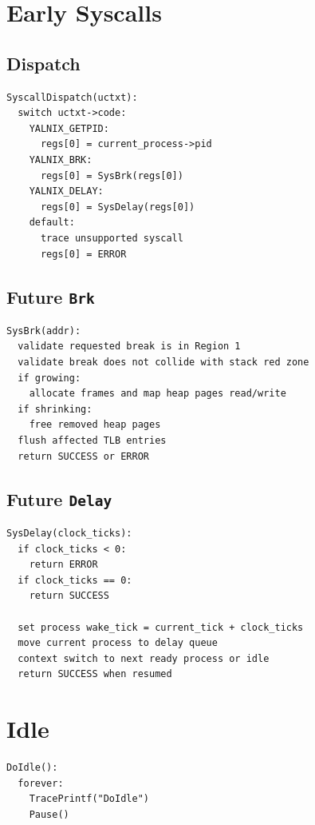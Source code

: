 \documentclass[11pt]{article}
\begin{document}
\section{Early Syscalls}

\subsection{Dispatch}

\begin{lstlisting}[style=yalnixpseudo]
SyscallDispatch(uctxt):
  switch uctxt->code:
    YALNIX_GETPID:
      regs[0] = current_process->pid
    YALNIX_BRK:
      regs[0] = SysBrk(regs[0])
    YALNIX_DELAY:
      regs[0] = SysDelay(regs[0])
    default:
      trace unsupported syscall
      regs[0] = ERROR
\end{lstlisting}

\subsection{Future \texttt{Brk}}

\begin{lstlisting}[style=yalnixpseudo]
SysBrk(addr):
  validate requested break is in Region 1
  validate break does not collide with stack red zone
  if growing:
    allocate frames and map heap pages read/write
  if shrinking:
    free removed heap pages
  flush affected TLB entries
  return SUCCESS or ERROR
\end{lstlisting}

\subsection{Future \texttt{Delay}}

\begin{lstlisting}[style=yalnixpseudo]
SysDelay(clock_ticks):
  if clock_ticks < 0:
    return ERROR
  if clock_ticks == 0:
    return SUCCESS

  set process wake_tick = current_tick + clock_ticks
  move current process to delay queue
  context switch to next ready process or idle
  return SUCCESS when resumed
\end{lstlisting}

\section{Idle}

\begin{lstlisting}[style=yalnixpseudo]
DoIdle():
  forever:
    TracePrintf("DoIdle")
    Pause()
\end{lstlisting}
\end{document}

